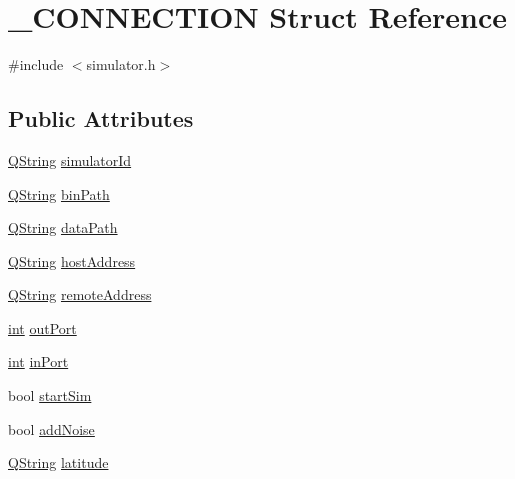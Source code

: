 \hypertarget{struct___c_o_n_n_e_c_t_i_o_n}{\section{\-\_\-\-C\-O\-N\-N\-E\-C\-T\-I\-O\-N Struct Reference}
\label{struct___c_o_n_n_e_c_t_i_o_n}
}


{\ttfamily \#include $<$simulator.\-h$>$}

\subsection*{Public Attributes}
\begin{DoxyCompactItemize}
\item 
\hyperlink{group___u_a_v_objects_plugin_gab9d252f49c333c94a72f97ce3105a32d}{Q\-String} \hyperlink{group___h_i_t_l_plugin_gae2769b70fdfc601ee4d7fc19c08bfe59}{simulator\-Id}
\item 
\hyperlink{group___u_a_v_objects_plugin_gab9d252f49c333c94a72f97ce3105a32d}{Q\-String} \hyperlink{group___h_i_t_l_plugin_ga7bd6d35f193af2ec2365db4a4faaf7e7}{bin\-Path}
\item 
\hyperlink{group___u_a_v_objects_plugin_gab9d252f49c333c94a72f97ce3105a32d}{Q\-String} \hyperlink{group___h_i_t_l_plugin_ga4505c573ba399fc3e915fec6842c3bcb}{data\-Path}
\item 
\hyperlink{group___u_a_v_objects_plugin_gab9d252f49c333c94a72f97ce3105a32d}{Q\-String} \hyperlink{group___h_i_t_l_plugin_ga21da3bd31909fdf7fd5116c2a91a1176}{host\-Address}
\item 
\hyperlink{group___u_a_v_objects_plugin_gab9d252f49c333c94a72f97ce3105a32d}{Q\-String} \hyperlink{group___h_i_t_l_plugin_ga72b83e685c950b6c36c9eed28c775ec4}{remote\-Address}
\item 
\hyperlink{ioapi_8h_a787fa3cf048117ba7123753c1e74fcd6}{int} \hyperlink{group___h_i_t_l_plugin_gaaba6cf28320e1105f7320ea8a21df15b}{out\-Port}
\item 
\hyperlink{ioapi_8h_a787fa3cf048117ba7123753c1e74fcd6}{int} \hyperlink{group___h_i_t_l_plugin_gabf3d6472bdcac5895a53143e1f84fb09}{in\-Port}
\item 
bool \hyperlink{group___h_i_t_l_plugin_ga17c6b00bf3f43c686cca76b3286ba75c}{start\-Sim}
\item 
bool \hyperlink{group___h_i_t_l_plugin_ga0d3c230504eb051a77593129ea6cd79f}{add\-Noise}
\item 
\hyperlink{group___u_a_v_objects_plugin_gab9d252f49c333c94a72f97ce3105a32d}{Q\-String} \hyperlink{group___h_i_t_l_plugin_gac06d25b8e020f633a60fadb7e7eedfa9}{latitude}

\end{DoxyCompactItemize}
